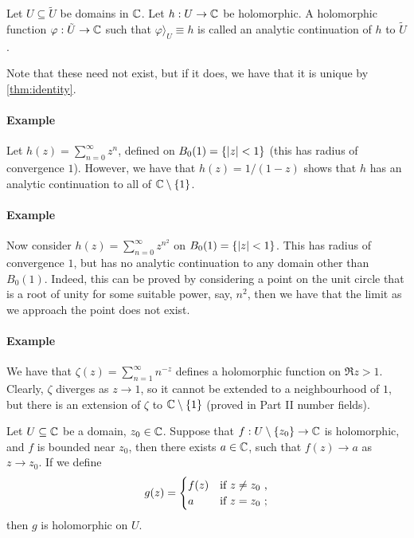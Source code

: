 \begin{definition}
  Let $U \subseteq \tilde{U}$ be domains in $\mathbb{C}$.
Let $h : U \rightarrow \mathbb{C}$ be holomorphic.
A holomorphic function $\varphi : \tilde{U} \rightarrow \mathbb{C}$ such that $\varphi\rangle_U \equiv h$ is called an analytic continuation of $h$ to $\tilde{U}$.
\end{definition}

Note that these need not exist, but if it does, we have that it is unique by \cref{thm:identity}.

\paragraph{Example}
Let $h(z) = \sum_{n=0}^\infty z^n$, defined on $B_0(1) = \{ \lvert z\rvert < 1 \}$ (this has radius of convergence $1$). However, we have that $h(z) = 1/(1-z)$ shows that $h$ has an analytic continuation to all of $\mathbb{C} \setminus \{ 1 \}$.

\paragraph{Example}
Now consider $h(z) = \sum_{n=0}^\infty z^{n^2}$ on $B_0(1) =  \{ \lvert z\rvert < 1 \}$. This has radius of convergence $1$, but has no analytic continuation to any domain other than $B_0(1)$.
Indeed, this can be proved by considering a point on the unit circle that is a root of unity for some suitable power, say, $n^2$, then we have that the limit as we approach the point does not exist.

\paragraph{Example}
We have that $\zeta(z) = \sum_{n=1}^\infty n^{-z}$ defines a holomorphic function on $\Re z > 1$.
Clearly, $\zeta$ diverges as $z \rightarrow 1$, so it cannot be extended to a neighbourhood of $1$, but there is an extension of $\zeta$ to $\mathbb{C} \setminus \{ 1 \}$ (proved in Part II number fields).


\begin{theorem}
Let $U \subseteq \mathbb{C}$ be a domain, $z_0 \in \mathbb{C}$.
Suppose that $f : U \setminus \{ z_0 \} \rightarrow \mathbb{C}$ is holomorphic, and $f$ is bounded near $z_0$, then there exists $a \in \mathbb{C}$, such that $f(z) \rightarrow a$ as $z \rightarrow z_0$.
If we define
\[
g(z) = \begin{cases}f(z) & \text{if } z \neq z_0 \ \text{,} \\ a & \text{if } z = z_0 \ \text{;} \end{cases}
\]
then $g$ is holomorphic on $U$.
\end{theorem}

